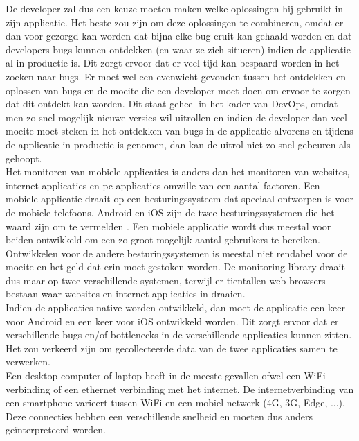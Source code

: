 De developer zal dus een keuze moeten maken welke oplossingen hij gebruikt in zijn applicatie. Het beste zou zijn om deze oplossingen te combineren, omdat er dan voor gezorgd kan worden dat bijna elke bug eruit kan gehaald worden en dat developers bugs kunnen ontdekken (en waar ze zich situeren) indien de applicatie al in productie is. Dit zorgt ervoor dat er veel tijd kan bespaard worden in het zoeken naar bugs. Er moet wel een evenwicht gevonden tussen het ontdekken en oplossen van bugs en de moeite die een developer moet doen om ervoor te zorgen dat dit ontdekt kan worden. Dit staat geheel in het kader van DevOps, omdat men zo snel mogelijk nieuwe versies wil uitrollen en indien de developer dan veel moeite moet steken in het ontdekken van bugs in de applicatie alvorens en tijdens de applicatie in productie is genomen, dan kan de uitrol niet zo snel gebeuren als gehoopt.\\



Het monitoren van mobiele applicaties is anders dan het monitoren van websites, internet applicaties en pc applicaties omwille van een aantal factoren. Een mobiele applicatie draait op een besturingssysteem dat speciaal ontworpen is voor de mobiele telefoons. Android en iOS zijn de twee besturingssystemen die het waard zijn om te vermelden \cite{MarketShare}. Een mobiele applicatie wordt dus meestal voor beiden ontwikkeld om een zo groot mogelijk aantal gebruikers te bereiken. Ontwikkelen voor de andere besturingssystemen is meestal niet rendabel voor de moeite en het geld dat erin moet gestoken worden. De monitoring library draait dus maar op twee verschillende systemen, terwijl er tientallen web browsers bestaan waar websites en internet applicaties in draaien. \\

Indien de applicaties native worden ontwikkeld, dan moet de applicatie een keer voor Android en een keer voor iOS ontwikkeld worden. Dit zorgt ervoor dat er verschillende bugs en/of bottlenecks in de verschillende applicaties kunnen zitten. Het zou verkeerd zijn om gecollecteerde data van de twee applicaties samen te verwerken. \\
Een desktop computer of laptop heeft in de meeste gevallen ofwel een WiFi verbinding of een ethernet verbinding met het internet. De internetverbinding van een smartphone varieert tussen WiFi en een mobiel netwerk (4G, 3G, Edge, ...). Deze connecties hebben een verschillende snelheid en moeten dus anders ge\"interpreteerd worden. \\

